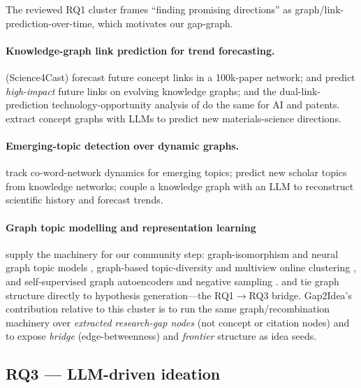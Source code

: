 The reviewed RQ1 cluster frames ``finding promising directions'' as
graph/link-prediction-over-time, which motivates our gap-graph.

\paragraph{Knowledge-graph link prediction for trend forecasting.}
\citet{predictingfuture2022} (Science4Cast) forecast future concept links in a
100k-paper network; \citet{impact4cast2024} and \citet{forecastinghigh2024}
predict \emph{high-impact} future links on evolving knowledge graphs;
\citet{forecastingfuture2023} and the dual-link-prediction technology-opportunity
analysis of \citet{technologyopportun2023} do the same for AI and patents.
\citet{predictingnew2025} extract concept graphs with LLMs to predict new
materials-science directions.

\paragraph{Emerging-topic detection over dynamic graphs.}
\citet{trackingdynamics2020} track co-word-network dynamics for emerging topics;
\citet{studypredictabilit2025} predict new scholar topics from knowledge networks;
\citet{empiricalstudy} couple a knowledge graph with an LLM to reconstruct
scientific history and forecast trends.

\paragraph{Graph topic modelling and representation learning} supply the
machinery for our community step: graph-isomorphism and neural graph topic models
\citep{ginopic2024,ngtm2025,graphconvolutional2023}, graph-based topic-diversity
and multiview online clustering \citep{noveltopic2023,multiviewdeep2022}, and
self-supervised graph autoencoders and negative sampling
\citep{s2gae2023,understandingnegat2020}. \citet{linkprediction2024} and
\citet{literaturebased2025} tie graph structure directly to hypothesis
generation---the RQ1$\rightarrow$RQ3 bridge. Gap2Idea's contribution relative to
this cluster is to run the same graph/recombination machinery over
\emph{extracted research-gap nodes} (not concept or citation nodes) and to expose
\emph{bridge} (edge-betweenness) and \emph{frontier} structure as idea seeds.

\subsection{RQ3 --- LLM-driven ideation}
\label{sec:lr-rq3}

